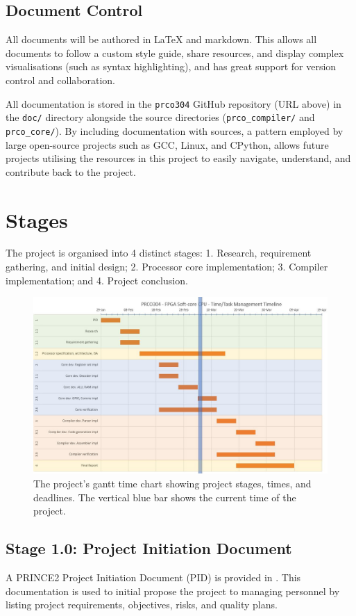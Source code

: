 \documentclass[11pt,a4paper]{report}
\begin{document}
\subsection{Document Control}
All documents will be authored in LaTeX and markdown. This allows all documents to follow a custom style guide, share resources, and display complex visualisations (such as syntax highlighting), and has great support for version control and collaboration.

All documentation is stored in the \verb|prco304| GitHub repository (URL above) in the \verb|doc/| directory alongside the source directories (\verb|prco_compiler/| and \verb|prco_core/|). By including documentation with sources, a pattern employed by large open-source projects such as GCC, Linux, and CPython, allows future projects utilising the resources in this project to easily navigate, understand, and contribute back to the project.

\section{Stages}
\label{stages}
\label{sect:proj_time}
The project is organised into 4 distinct stages: 1. Research, requirement gathering, and initial design; 2. Processor core implementation; 3. Compiler implementation; and 4. Project conclusion.

\begin{figure}[H]
\centering
\includegraphics[scale=0.6]{gantt}
\caption{The project's gantt time chart showing project stages, times, and deadlines. The vertical blue bar shows the current time of the project.}
\label{fig:proj_time}
\end{figure}

\subsection*{Stage 1.0: Project Initiation Document}
A PRINCE2 Project Initiation Document (PID) is provided in {}. This documentation is used to initial propose the project to managing personnel by listing project requirements, objectives, risks, and quality plans.
\end{document}
